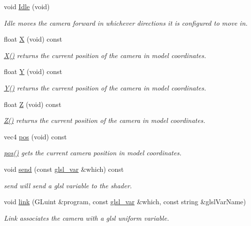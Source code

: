 \begin{DoxyCompactItemize}
void \hyperlink{class_camera_aec3559fe43597656629fdb00157d3c73}{\-Idle} (void)
\begin{DoxyCompactList}\small\item\em \-Idle moves the camera forward in whichever directions it is configured to move in. \end{DoxyCompactList}\item 
float \hyperlink{class_camera_a2f7fd64d5d6e0dfb5edcca53c7d15994}{\-X} (void) const 
\begin{DoxyCompactList}\small\item\em \hyperlink{class_camera_a2f7fd64d5d6e0dfb5edcca53c7d15994}{\-X()} returns the current position of the camera in model coordinates. \end{DoxyCompactList}\item 
float \hyperlink{class_camera_a37529ef93871f547ebfd5862bc6cce62}{\-Y} (void) const 
\begin{DoxyCompactList}\small\item\em \hyperlink{class_camera_a37529ef93871f547ebfd5862bc6cce62}{\-Y()} returns the current position of the camera in model coordinates. \end{DoxyCompactList}\item 
float \hyperlink{class_camera_abf1730e47e8e51c76acbddcaa85e2475}{\-Z} (void) const 
\begin{DoxyCompactList}\small\item\em \hyperlink{class_camera_abf1730e47e8e51c76acbddcaa85e2475}{\-Z()} returns the current position of the camera in model coordinates. \end{DoxyCompactList}\item 
vec4 \hyperlink{class_camera_a9982ac5f48fe0af97fefa725080d6da6}{pos} (void) const 
\begin{DoxyCompactList}\small\item\em \hyperlink{class_camera_a9982ac5f48fe0af97fefa725080d6da6}{pos()} gets the current camera position in model coordinates. \end{DoxyCompactList}\item 
void \hyperlink{class_camera_a61e55b524e563fc09a2e02e1b1046de3}{send} (const \hyperlink{class_camera_a6ff726a75a430e4f17e5dec42e4d4405}{glsl\-\_\-var} \&which) const 
\begin{DoxyCompactList}\small\item\em send will send a glsl variable to the shader. \end{DoxyCompactList}\item 
void \hyperlink{class_camera_ab7574214240c67ca774255ef1d7616de}{link} (\-G\-Luint \&program, const \hyperlink{class_camera_a6ff726a75a430e4f17e5dec42e4d4405}{glsl\-\_\-var} \&which, const string \&glsl\-Var\-Name)
\begin{DoxyCompactList}\small\item\em \-Link associates the camera with a glsl uniform variable. \end{DoxyCompactList}\end{DoxyCompactItemize}
